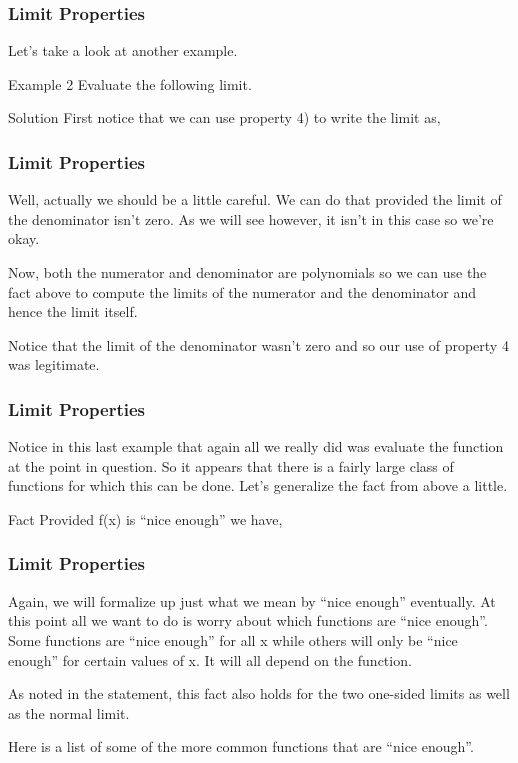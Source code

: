 \documentclass{beamer}
\begin{document}
\begin{frame}[fragile]
	\frametitle{Limit Properties}
	\Large
Let’s take a look at another example.
 
Example 2  Evaluate the following limit.

Solution
First notice that we can use property 4) to write the limit as,

 
\end{frame}
\begin{frame}[fragile]
	\frametitle{Limit Properties}
	\Large
Well, actually we should be a little careful.  We can do that provided the limit of the denominator isn’t zero.  As we will see however, it isn’t in this case so we’re okay.
 
Now, both the numerator and denominator are polynomials so we can use the fact above to compute the limits of the numerator and the denominator and hence the limit itself.

 
Notice that the limit of the denominator wasn’t zero and so our use of property 4 was legitimate.
 
\end{frame}
\begin{frame}[fragile]
	\frametitle{Limit Properties}
	\Large
	
Notice in this last example that again all we really did was evaluate the function at the point in question.  So it appears that there is a fairly large class of functions for which this can be done.  Let’s generalize the fact from above a little.
 
Fact
Provided f(x) is “nice enough” we have,
 
    
\end{frame}
\begin{frame}[fragile]
	\frametitle{Limit Properties}
	\Large 
 
Again, we will formalize up just what we mean by “nice enough” eventually.  At this point all we want to do is worry about which functions are “nice enough”.  Some functions are “nice enough” for all x while others will only be “nice enough” for certain values of x.  It will all depend on the function.
 
As noted in the statement, this fact also holds for the two one-sided limits as well as the normal limit.
 
Here is a list of some of the more common functions that are “nice enough”.
\end{frame}
\end{document}
